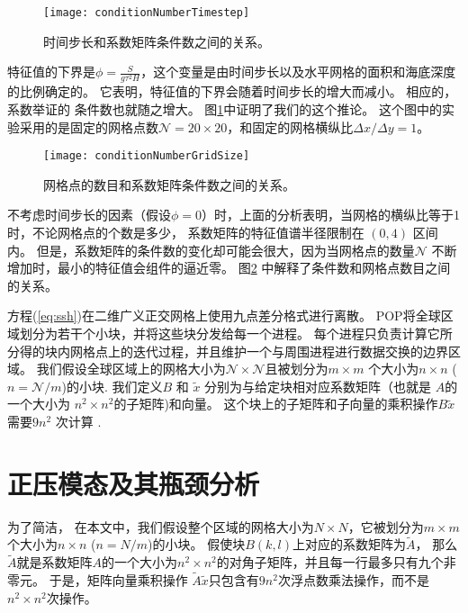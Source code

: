 \begin{figure}[ht]
\centering
\texttt{[image: conditionNumberTimestep]}
\caption[] {时间步长和系数矩阵条件数之间的关系。 \label{fig:conditionNumberDt}}
\end{figure}



特征值的下界是$\phi=\frac{S }{g \tau^2 H}$，这个变量是由时间步长以及水平网格的面积和海底深度的比例确定的。
它表明，特征值的下界会随着时间步长的增大而减小。 
相应的，系数举证的 条件数也就随之增大。
图\ref{fig:conditionNumberDt}中证明了我们的这个推论。
这个图中的实验采用的是固定的网格点数$\mathcal{N} = 20\times 20$，和固定的网格横纵比$\Delta x /{\Delta y} = 1$。 

\begin{figure}[ht]
\centering
\texttt{[image: conditionNumberGridSize]}
\caption[] {网格点的数目和系数矩阵条件数之间的关系。 \label{fig:conditionNumbGrid}}
\end{figure}
 
不考虑时间步长的因素（假设$\phi=0$）时，上面的分析表明，当网格的横纵比等于1时，不论网格点的个数是多少， 系数矩阵的特征值谱半径限制在 $(0,4)$ 区间内。
但是，系数矩阵的条件数的变化却可能会很大，因为当网格点的数量$\mathcal{N}$ 不断增加时，最小的特征值会组件的逼近零。 
图\ref{fig:conditionNumbGrid} 中解释了条件数和网格点数目之间的关系。 

方程(\ref{eq:ssh})在二维广义正交网格上使用九点差分格式进行离散。  
POP将全球区域划分为若干个小块，并将这些块分发给每一个进程。
每个进程只负责计算它所分得的块内网格点上的迭代过程，并且维护一个与周围进程进行数据交换的边界区域。 
我们假设全球区域上的网格大小为$\mathcal{N}\times
\mathcal{N}$且被划分为$m\times m$ 个大小为$n\times n$ ($n=\mathcal{N}/m$)的小块.
我们定义$B$ 和 $\tilde{x}$ 分别为与给定块相对应系数矩阵（也就是 $A$的一个大小为 $n^2\times n^2$的子矩阵)和向量。
这个块上的子矩阵和子向量的乘积操作$B\tilde{x}$ 需要$9n^2$ 次计算 \cite{hu2013scalable}.

\section{正压模态及其瓶颈分析}
\label{solver:bottleneck}


为了简洁， 在本文中，我们假设整个区域的网格大小为$N\times N$，它被划分为$m\times m$个大小为$n\times n$ ($n=N/m$)的小块。 
假使块$B(k,l)$上对应的系数矩阵为$\tilde{A}$， 那么$\tilde{A}$就是系数矩阵$A$的一个大小为$n^2\times n^2$的对角子矩阵，并且每一行最多只有九个非零元。 
于是，矩阵向量乘积操作 $\tilde{A}\tilde{x}$只包含有$9n^2$次浮点数乘法操作，而不是$n^2\times n^2$次操作。 

